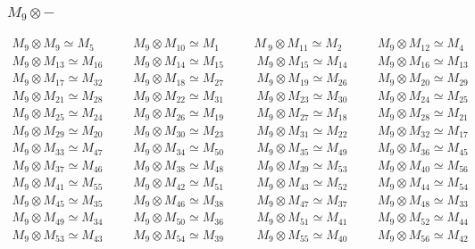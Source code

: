 \subsubsection{$M_9\otimes -$}
\begin{align*}
M_{9} \otimes M_{9} \simeq M_{5} &&& M_{9} \otimes M_{10} \simeq M_{1} &&& M_{\
9} \otimes M_{11} \simeq M_{2} &&& M_{9} \otimes M_{12} \simeq M_{4}\\
M_{9} \otimes M_{13} \simeq M_{16} &&& M_{9} \otimes M_{14} \simeq M_{15} &&& \
M_{9} \otimes M_{15} \simeq M_{14} &&& M_{9} \otimes M_{16} \simeq M_{13}\\
M_{9} \otimes M_{17} \simeq M_{32} &&& M_{9} \otimes M_{18} \simeq M_{27} &&& \
M_{9} \otimes M_{19} \simeq M_{26} &&& M_{9} \otimes M_{20} \simeq M_{29}\\
M_{9} \otimes M_{21} \simeq M_{28} &&& M_{9} \otimes M_{22} \simeq M_{31} &&& \
M_{9} \otimes M_{23} \simeq M_{30} &&& M_{9} \otimes M_{24} \simeq M_{25}\\
M_{9} \otimes M_{25} \simeq M_{24} &&& M_{9} \otimes M_{26} \simeq M_{19} &&& \
M_{9} \otimes M_{27} \simeq M_{18} &&& M_{9} \otimes M_{28} \simeq M_{21}\\
M_{9} \otimes M_{29} \simeq M_{20} &&& M_{9} \otimes M_{30} \simeq M_{23} &&& \
M_{9} \otimes M_{31} \simeq M_{22} &&& M_{9} \otimes M_{32} \simeq M_{17}\\
M_{9} \otimes M_{33} \simeq M_{47} &&& M_{9} \otimes M_{34} \simeq M_{50} &&& \
M_{9} \otimes M_{35} \simeq M_{49} &&& M_{9} \otimes M_{36} \simeq M_{45}\\
M_{9} \otimes M_{37} \simeq M_{46} &&& M_{9} \otimes M_{38} \simeq M_{48} &&& \
M_{9} \otimes M_{39} \simeq M_{53} &&& M_{9} \otimes M_{40} \simeq M_{56}\\
M_{9} \otimes M_{41} \simeq M_{55} &&& M_{9} \otimes M_{42} \simeq M_{51} &&& \
M_{9} \otimes M_{43} \simeq M_{52} &&& M_{9} \otimes M_{44} \simeq M_{54}\\
M_{9} \otimes M_{45} \simeq M_{35} &&& M_{9} \otimes M_{46} \simeq M_{38} &&& \
M_{9} \otimes M_{47} \simeq M_{37} &&& M_{9} \otimes M_{48} \simeq M_{33}\\
M_{9} \otimes M_{49} \simeq M_{34} &&& M_{9} \otimes M_{50} \simeq M_{36} &&& \
M_{9} \otimes M_{51} \simeq M_{41} &&& M_{9} \otimes M_{52} \simeq M_{44}\\
M_{9} \otimes M_{53} \simeq M_{43} &&& M_{9} \otimes M_{54} \simeq M_{39} &&& \
M_{9} \otimes M_{55} \simeq M_{40} &&& M_{9} \otimes M_{56} \simeq M_{42}\\
\end{align*}

